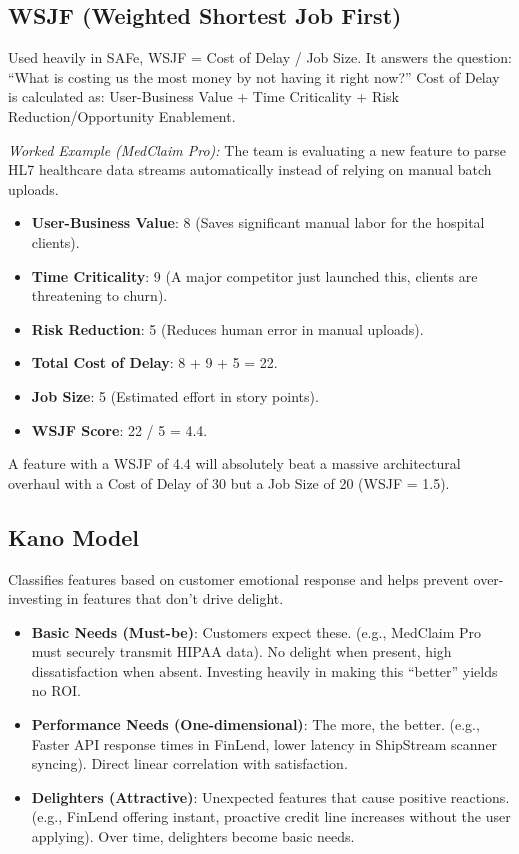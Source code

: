 \subsection{WSJF (Weighted Shortest Job
First)}\label{wsjf-weighted-shortest-job-first}

Used heavily in SAFe, WSJF = Cost of Delay / Job Size. It answers the
question: ``What is costing us the most money by not having it right
now?'' Cost of Delay is calculated as: User-Business Value + Time
Criticality + Risk Reduction/Opportunity Enablement.

\emph{Worked Example (MedClaim Pro):} The team is evaluating a new
feature to parse HL7 healthcare data streams automatically instead of
relying on manual batch uploads.

\begin{itemize}
\tightlist
\item
  \textbf{User-Business Value}: 8 (Saves significant manual labor for
  the hospital clients).
\item
  \textbf{Time Criticality}: 9 (A major competitor just launched this,
  clients are threatening to churn).
\item
  \textbf{Risk Reduction}: 5 (Reduces human error in manual uploads).
\item
  \textbf{Total Cost of Delay}: 8 + 9 + 5 = 22.
\item
  \textbf{Job Size}: 5 (Estimated effort in story points).
\item
  \textbf{WSJF Score}: 22 / 5 = 4.4.
\end{itemize}

A feature with a WSJF of 4.4 will absolutely beat a massive
architectural overhaul with a Cost of Delay of 30 but a Job Size of 20
(WSJF = 1.5).

\subsection{Kano Model}\label{kano-model}

Classifies features based on customer emotional response and helps
prevent over-investing in features that don't drive delight.

\begin{itemize}
\tightlist
\item
  \textbf{Basic Needs (Must-be)}: Customers expect these. (e.g.,
  MedClaim Pro must securely transmit HIPAA data). No delight when
  present, high dissatisfaction when absent. Investing heavily in making
  this ``better'' yields no ROI.
\item
  \textbf{Performance Needs (One-dimensional)}: The more, the better.
  (e.g., Faster API response times in FinLend, lower latency in
  ShipStream scanner syncing). Direct linear correlation with
  satisfaction.
\item
  \textbf{Delighters (Attractive)}: Unexpected features that cause
  positive reactions. (e.g., FinLend offering instant, proactive credit
  line increases without the user applying). Over time, delighters
  become basic needs.
\end{itemize}

